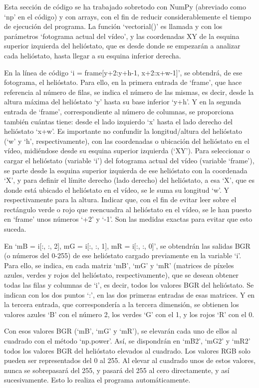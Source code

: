 \documentclass[12pt]{article}
\begin{document}
Esta sección de código se ha trabajado sobretodo con NumPy (abreviado como ‘np’ en el código) y con arrays, con el fin de reducir considerablemente el tiempo de ejecución del programa. La función ‘vectorial()’ es llamada y con los parámetros ‘fotograma actual del vídeo’, y las coordenadas XY de la esquina superior izquierda del helióstato, que es desde donde se empezarán a analizar cada helióstato, hasta llegar a su esquina inferior derecha.

En la línea de código ‘i = frame[y+2:y+h-1, x+2:x+w-1]’, se obtendrá, de ese fotograma, el helióstato. Para ello, en la primera entrada de ‘frame’, que hace referencia al número de filas, se indica el número de las mismas, es decir, desde la altura máxima del helióstato ‘y’ hasta su base inferior ‘y+h’. Y en la segunda entrada de ‘frame’, correspondiente al número de columnas, se proporciona también cuántas tiene: desde el lado izquierdo ‘x’ hasta el lado derecho del helióstato ‘x+w’. Es importante no confundir la longitud/altura del helióstato (‘w’ y ‘h’, respectivamente), con las coordenadas o ubicación del helióstato en el vídeo, midiéndose desde su esquina superior izquierda (‘XY’). Para seleccionar o cargar el helióstato (variable ‘i’) del fotograma actual del vídeo (variable ‘frame’), se parte desde la esquina superior izquierda de ese helióstato con la coordenada ‘X’, y para definir el límite derecho (lado derecho) del helióstato, a esa ‘X’, que es donde está ubicado el helióstato en el vídeo, se le suma su longitud ‘w’. Y respectivamente para la altura. Indicar que, con el fin de evitar leer sobre el rectángulo verde o rojo que reencuadra al helióstato en el vídeo, se le han puesto en ‘frame’ unos números ‘+2’ y ‘-1’. Son las medidas exactas para evitar que esto suceda.

En ‘mB = i[:, :, 2], mG = i[:, :, 1], mR = i[:, :, 0]’, se obtendrán las salidas BGR (o números del 0-255) de ese helióstato cargado previamente en la variable ‘i’. Para ello, se indica, en cada matriz ‘mB’, ‘mG’ y ‘mR’ (matrices de píxeles azules, verdes y rojos del helióstato, respectivamente), que se desean obtener todas las filas y columnas de ‘i’, es decir, todos los valores BGR del helióstato. Se indican con los dos puntos ‘:’, en las dos primeras entradas de esas matrices. Y en la tercera entrada, que correspondería a la tercera dimensión, se obtienen los valores azules ‘B’ con el número 2, los verdes ‘G’ con el 1, y los rojos ‘R’ con el 0.

Con esos valores BGR (‘mB’, ‘mG’ y ‘mR’), se elevarán cada uno de ellos al cuadrado con el método ‘np.power’. Así, se dispondrán en ‘mB2’, ‘mG2’ y ‘mR2’ todos los valores BGR del helióstato elevados al cuadrado. Los valores RGB solo pueden ser representados del 0 al 255. Al elevar al cuadrado unos de estos valores, nunca se sobrepasará del 255, y pasará del 255 al cero directamente, y así sucesivamente. Esto lo realiza el programa automáticamente.
\end{document}
